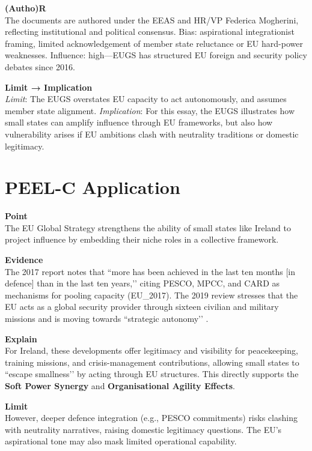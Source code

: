 \textbf{(Autho)R} \\  
The documents are authored under the EEAS and HR/VP Federica Mogherini, reflecting institutional and political consensus. Bias: aspirational integrationist framing, limited acknowledgement of member state reluctance or EU hard-power weaknesses. Influence: high—EUGS has structured EU foreign and security policy debates since 2016.  

\textbf{Limit → Implication} \\  
\textit{Limit}: The EUGS overstates EU capacity to act autonomously, and assumes member state alignment.  
\textit{Implication}: For this essay, the EUGS illustrates how small states can amplify influence through EU frameworks, but also how vulnerability arises if EU ambitions clash with neutrality traditions or domestic legitimacy.  

\section*{PEEL-C Application}

\textbf{Point} \\  
The EU Global Strategy strengthens the ability of small states like Ireland to project influence by embedding their niche roles in a collective framework.  

\textbf{Evidence} \\  
The 2017 report notes that ``more has been achieved in the last ten months [in defence] than in the last ten years,’’ citing PESCO, MPCC, and CARD as mechanisms for pooling capacity (EU\_2017). The 2019 review stresses that the EU acts as a global security provider through sixteen civilian and military missions and is moving towards ``strategic autonomy’’ \parencite{EU_2019}.  

\textbf{Explain} \\  
For Ireland, these developments offer legitimacy and visibility for peacekeeping, training missions, and crisis-management contributions, allowing small states to ``escape smallness’’ by acting through EU structures. This directly supports the \textbf{Soft Power Synergy} and \textbf{Organisational Agility Effects}.  

\textbf{Limit} \\  
However, deeper defence integration (e.g., PESCO commitments) risks clashing with neutrality narratives, raising domestic legitimacy questions. The EU’s aspirational tone may also mask limited operational capability.  

